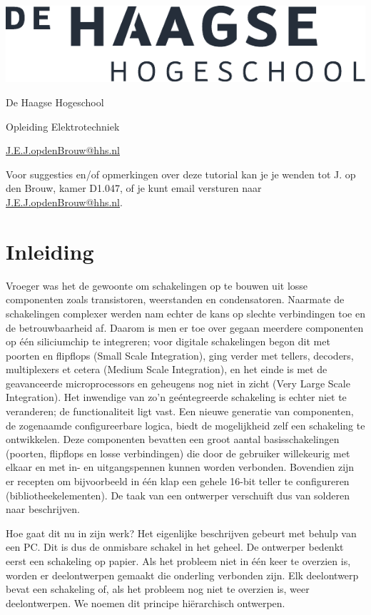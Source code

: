 \documentclass[a4paper,12pt,fleqn,twoside]{book}
\author{\tutauthor}
\title{\tuttitle}
\date{\today}
\makeatletter
\let\cleardoublepage\clearpage
\newcommand\emailaddress{\href{mailto:J.E.J.opdenBrouw@hhs.nl}{\sffamily J.E.J.opdenBrouw@hhs.nl}}
\def\maketitle{%
  \null
  \thispagestyle{empty}%
  \vfill
  \begin{center}\leavevmode
    {\fontfamily{phv}\fontsize{35pt}{60pt}\selectfont\bfseries\scshape \@title\par}%
    \vskip 8.0cm
    \begin{minipage}[c]{.50\linewidth}
       \includegraphics[width=\linewidth]{HHS_NL_grijs_FC}
    \end{minipage}\hfill
    \begin{minipage}[c]{0.40\linewidth}
       {\hfill \large \@author\par}%
       \vskip 0.03cm
       {\hfill \large De Haagse Hogeschool\par}%
       \vskip 0.03cm
       {\hfill \large Opleiding Elektrotechniek\par}%
       \vskip 0.03cm
       {\hfill \large \@date\par}%
       \vskip 0.03cm
       {\hfill \large \emailaddress\par}%
  \end{minipage}
  \end{center}%
  \vfill
  \null
  }
\makeatother
\begin{document}
\raggedbottom

\maketitle

\tableofcontents
\vfill

Voor suggesties en/of opmerkingen over deze tutorial kan je je wenden tot
J. op den Brouw, kamer D1.047, of je kunt email versturen naar \emailaddress.


\newpage
\listoffigures
\begingroup
\let\cleardoublepage\relax
\listoftables
\lstlistoflistings
\endgroup



\chapter{Inleiding}
\label{chap:inleiding}
Vroeger was het de gewoonte om schakelingen op te bouwen uit losse componenten
zoals transistoren, weerstanden en condensatoren. Naarmate de schakelingen
complexer werden nam echter de kans op slechte verbindingen toe en de
betrouwbaarheid af. Daarom is men er toe over gegaan meerdere componenten op
\'{e}\'{e}n siliciumchip te integreren; voor digitale schakelingen begon dit
met poorten en flipflops (Small Scale Integration), ging verder  met tellers,
decoders, multiplexers et cetera (Medium Scale Integration), en het einde is
met de geavanceerde microprocessors en geheugens nog niet in zicht (Very Large
Scale Integration). Het inwendige van zo'n ge\'{e}ntegreerde schakeling is
echter niet te veranderen; de functionaliteit ligt vast. Een nieuwe generatie
van componenten, de zogenaamde configureerbare logica, biedt de mogelijkheid
zelf een schakeling te ontwikkelen. Deze componenten bevatten een groot aantal
basisschakelingen (poorten, flipflops en losse verbindingen) die door de
gebruiker willekeurig met elkaar en met in- en uitgangspennen kunnen worden
verbonden. Bovendien zijn er recepten om bijvoorbeeld in \'{e}\'{e}n klap een
gehele 16-bit teller te configureren (bibliotheekelementen). De taak van een
ontwerper verschuift dus van solderen naar beschrijven.

Hoe gaat dit nu in zijn werk? Het eigenlijke beschrijven gebeurt met behulp van
een PC. Dit is dus de onmisbare schakel in het geheel. De ontwerper bedenkt
eerst een schakeling op papier. Als het probleem niet in \'{e}\'{e}n keer te
overzien  is, worden er deelontwerpen gemaakt die onderling verbonden zijn. Elk
deelontwerp bevat een schakeling of, als het probleem nog niet te overzien 
is, weer deelontwerpen. We noemen dit principe hi\"{e}rarchisch ontwerpen.
\end{document}
